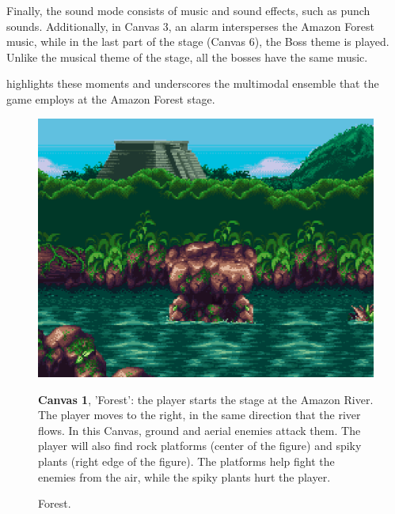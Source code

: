 \documentclass[english]{textolivre}
\begin{document}
Finally, the sound mode consists of music and sound effects, such as punch sounds. Additionally, in Canvas 3, an alarm intersperses the Amazon Forest music, while in the last part of the stage (Canvas 6), the Boss theme is played. Unlike the musical theme of the stage, all the bosses have the same music.

highlights these moments and underscores the multimodal ensemble that the game employs at the Amazon Forest stage.

\begin{figure}[htbp]
\begin{minipage}[t]{.47\textwidth}
\vspace{0pt}
\includegraphics[width=\textwidth]{fig-005.png}
\caption{Forest.}
\label{fig-005}
\end{minipage}
\hfill
\begin{minipage}[t]{.47\textwidth}
\vspace{2pt}
\textbf{Canvas 1}, 'Forest': the player starts the stage at the Amazon River. The player moves to the right, in the same direction that the river flows. In this Canvas, ground and aerial enemies attack them. The player will also find rock platforms (center of the figure) and spiky plants (right edge of the figure). The platforms help fight the enemies from the air, while the spiky plants hurt the player.
\end{minipage}
\end{figure}
\end{document}
